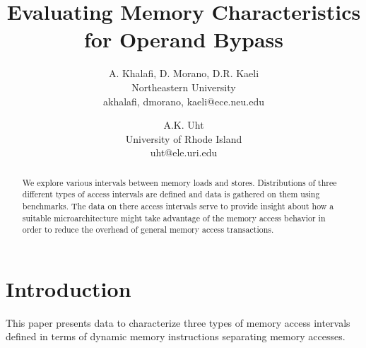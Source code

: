 %
\usepackage[english]{babel}
\usepackage{epsfig}
%
%
%
%
%
%
\textwidth 6.5in
\textheight 8.875in
\topmargin -0.4in
%
%
%

%
%
%
\title{Evaluating Memory Characteristics for Operand Bypass}
%
\author{
A. Khalafi, D. Morano, D.R. Kaeli\\
Northeastern University\\
{akhalafi, dmorano, kaeli}@ece.neu.edu\\
\and
A.K. Uht\\
University of Rhode Island\\ 
uht@ele.uri.edu
}
%
%
\date{}
%
\maketitle
%
%
%
\begin{abstract}
%
We explore various intervals between memory loads and stores.
Distributions of three different types of access intervals
are defined and data is gathered on them using benchmarks.
The data on there access intervals serve to provide insight
about how a suitable microarchitecture might take advantage
of the memory access behavior in order to reduce the overhead
of general memory access transactions.
%
\end{abstract}
%
%
\vspace{-0.25in}
\section{Introduction}
\vspace{-0.15in}
%
This paper presents data to characterize three types of
memory access intervals defined in terms of dynamic memory
instructions separating memory accesses.




